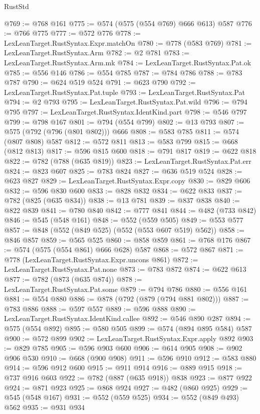 \begin{lexlean}{RustStd}
\begin{coremodule}
@769 := @768 @161
@775 := @574 (@575 (@554 @769) @666 @613) @587
@776 := @766 @775
@777 := @572 @776
@778 := LexLeanTarget.RustSyntax.Expr.matchOn
@780 := @778 (@583 @769)
@781 := LexLeanTarget.RustSyntax.Arm
@782 := @2 @781
@783 := LexLeanTarget.RustSyntax.Arm.mk
@784 := LexLeanTarget.RustSyntax.Pat.ok
@785 := @556 @146
@786 := @554 @785
@787 := @784 @786
@788 := @783 @787
@790 := @624 @519 @524
@791 := @623 @790
@792 := LexLeanTarget.RustSyntax.Pat.tuple
@793 := LexLeanTarget.RustSyntax.Pat
@794 := @2 @793
@795 := LexLeanTarget.RustSyntax.Pat.wild
@796 := @794 @795
@797 := LexLeanTarget.RustSyntax.IdentKind.part
@798 := @546 @797
@799 := @798 @167
@801 := @794 (@554 @799)
@802 := @13 @793
@807 := @575 (@792 (@796 (@801 @802))) @666
@808 := @583 @785
@811 := @574 (@807 @808) @587
@812 := @572 @811
@813 := @583 @799
@815 := @668 (@812 @813)
@817 := @596 @815 @600
@818 := @791 @817
@819 := @622 @818
@822 := @782 (@788 (@635 @819))
@823 := LexLeanTarget.RustSyntax.Pat.err
@824 := @823 @607
@825 := @783 @824
@827 := @636 @519 @524
@828 := @623 @827
@829 := LexLeanTarget.RustSyntax.Expr.copy
@830 := @829 @606
@832 := @596 @830 @600
@833 := @828 @832
@834 := @622 @833
@837 := @782 (@825 (@635 @834))
@838 := @13 @781
@839 := @837 @838
@840 := @822 @839
@841 := @780 @840
@842 := @777 @841
@844 := @482 (@733 @842)
@846 := @545 (@548 @161)
@848 := @552 (@559 @505)
@849 := @553 @577
@857 := @848 (@552 (@849 @525) (@552 (@553 @607 @519) @562))
@858 := @846 @857
@859 := @565 @525
@860 := @858 @859
@861 := @768 @176
@867 := @574 (@575 (@554 @861) @666 @628) @587
@868 := @572 @867
@871 := @778 (LexLeanTarget.RustSyntax.Expr.uncons @861)
@872 := LexLeanTarget.RustSyntax.Pat.none
@873 := @783 @872
@874 := @622 @613
@877 := @782 (@873 (@635 @874))
@878 := LexLeanTarget.RustSyntax.Pat.some
@879 := @794 @786
@880 := @556 @161
@881 := @554 @880
@886 := @878 (@792 (@879 (@794 @881 @802)))
@887 := @783 @886
@888 := @597 @557
@889 := @596 @888
@890 := LexLeanTarget.RustSyntax.IdentKind.callee
@892 := @546 @890 @287
@894 := @575 (@554 @892)
@895 := @580 @505
@899 := @574 (@894 @895 @584) @587
@900 := @572 @899
@902 := LexLeanTarget.RustSyntax.Expr.apply @892
@903 := @829 @785
@905 := @596 @903 @600
@906 := @614 @905
@908 := @902 @906 @530
@910 := @668 (@900 @908)
@911 := @596 @910
@912 := @583 @880
@914 := @596 @912 @600
@915 := @911 @914
@916 := @889 @915
@918 := @737 @916 @603
@922 := @782 (@887 (@635 @918)) @838
@923 := @877 @922
@924 := @871 @923
@925 := @868 @924
@927 := @482 (@860 @925)
@929 := @545 (@548 @167)
@931 := @552 (@559 @525)
@934 := @552 (@849 @493) @562
@935 := @931 @934

\end{coremodule}
\end{lexlean}
